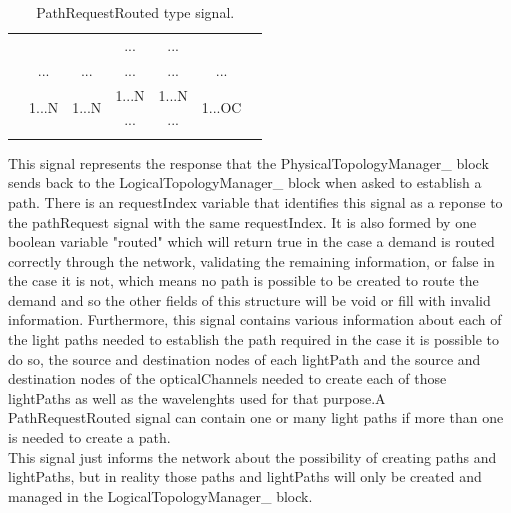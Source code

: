 \begin{table}[H]
\begin{tabular}{|lclccccl|}
	\multicolumn{1}{|l|}{} & \multicolumn{2}{c|}{}                                     & \multicolumn{1}{c|}{}                                          & \multicolumn{1}{c|}{...}                 & \multicolumn{1}{c|}{...}                      & \multicolumn{1}{c|}{}                                     &  \\ \cline{2-7}
	\multicolumn{1}{|l|}{} & \multicolumn{2}{c|}{...}                                  & \multicolumn{1}{c|}{...}                                       & \multicolumn{1}{c|}{...}                 & \multicolumn{1}{c|}{...}                      & \multicolumn{1}{c|}{...}                                  &  \\ \cline{2-7}
	\multicolumn{1}{|l|}{} & \multicolumn{2}{c|}{\multirow{2}{*}{1...N}}               & \multicolumn{1}{c|}{\multirow{2}{*}{1...N}}                    & \multicolumn{1}{c|}{1...N}               & \multicolumn{1}{c|}{1...N}                    & \multicolumn{1}{c|}{\multirow{2}{*}{1...OC}}              &  \\ \cline{5-6}
	\multicolumn{1}{|l|}{} & \multicolumn{2}{c|}{}                                     & \multicolumn{1}{c|}{}                                          & \multicolumn{1}{c|}{...}                 & \multicolumn{1}{c|}{...}                      & \multicolumn{1}{c|}{}                                     &  \\ \cline{2-7}
	& \multicolumn{1}{l}{}        &                             & \multicolumn{1}{l}{}                                           & \multicolumn{1}{l}{}                     & \multicolumn{1}{l}{}                          & \multicolumn{1}{l}{}                                      &  \\ \hline
\end{tabular}
	\caption{PathRequestRouted type signal.}
	\label{pathRequestRouted}
\end{table}
This signal represents the response that the PhysicalTopologyManager\_  block sends back to the LogicalTopologyManager\_ block when asked to establish a path. There is an requestIndex variable that identifies this signal as a reponse to the pathRequest signal with the same requestIndex. It is also formed by one boolean variable "routed"  which will return true in the case a demand is routed correctly through the network, validating the remaining information, or false in the case it is not, which means no path is possible to be created to route the demand and so the other fields of this structure will be void or fill with invalid information. Furthermore, this signal contains various information about each of the light paths needed to establish the path required in the case it is possible to do so, the source and destination nodes of each lightPath and the source and destination nodes of the opticalChannels needed to create each of those lightPaths as well as the wavelenghts used for that purpose.A PathRequestRouted signal can contain one or many light paths if more than one is needed to create a path.\\ This signal just informs the network about the possibility of creating paths and lightPaths, but in reality those paths and lightPaths will only be created and managed in the LogicalTopologyManager\_  block.

